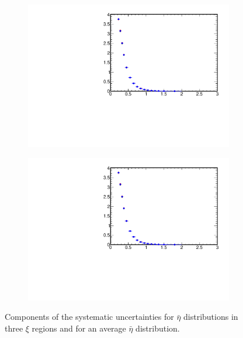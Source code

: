 \begin{figure}[h!]
\begin{subfigure}{.49\textwidth}
		\includegraphics[width=\textwidth,page=20]{chapters/chrgSTAR/img/syst/out_chargedmax.pdf}
	\end{subfigure}
	\begin{subfigure}{.49\textwidth}
		\includegraphics[width=\textwidth,page=24]{chapters/chrgSTAR/img/syst/out_chargedmax.pdf}
	\end{subfigure}
	\caption{Components of the systematic uncertainties for $\bar{\eta}$ distributions in three $\xi$ regions and for an average $\bar{\eta}$ distribution. }
	\label{fig:results_star_eta_syst}
	\vspace{-2.5cm}
\end{figure}

